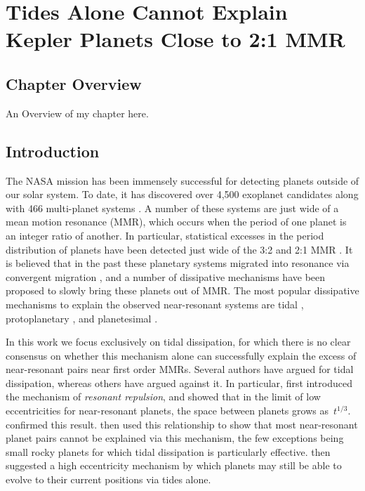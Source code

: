 \chapter[Tides Alone Cannot Explain Kepler Planets Close to 2:1 MMR]{Tides Alone Cannot Explain Kepler Planets Close to 2:1 MMR}

\section{Chapter Overview}

An Overview of my chapter here.

\section{Introduction}
\label{sec:introduction}
The NASA \kep{} mission has been immensely successful for detecting planets outside of our solar system.
To date, it has discovered over 4,500 exoplanet candidates along with 466 multi-planet systems \citep{Akeson2013,Rowe2014}. 
A number of these systems are just wide of a mean motion resonance (MMR), which occurs when the period of one planet is an integer ratio of another. 
In particular, statistical excesses in the period distribution of \kep{} planets have been detected just wide of the 3:2 and 2:1 MMR \citep[][]{Lissauer2011,Fabrycky2014,Steffen2015}.
It is believed that in the past these planetary systems migrated into resonance via convergent migration \citep{Lee2002}, and a number of dissipative mechanisms have been proposed to slowly bring these planets out of MMR.
The most popular dissipative mechanisms to explain the observed near-resonant systems are tidal \citep{LithwickWu2012, Batygin2013, Delisle2014},  protoplanetary \citep{Rein2012b, Baruteau2013, Goldreich2014}, and planetesimal \citep{Moore2013, Chatterjee2015}. 

In this work we focus exclusively on tidal dissipation, for which there is no clear consensus on whether this mechanism alone can successfully explain the excess of near-resonant pairs near first order MMRs. 
Several authors \citep{LithwickWu2012,Batygin2013} have argued for \citep{Delisle2014} tidal dissipation, whereas others \citep{Lee2013} have argued against it. 
In particular, \citet{LithwickWu2012} first introduced the mechanism of \textit{resonant repulsion}, and showed that in the limit of low eccentricities for near-resonant planets, the space between planets grows as~$t^{1/3}$.
\citet{Batygin2013} confirmed this result.
\citet{Lee2013} then used this relationship to show that most near-resonant planet pairs cannot be explained via this mechanism, the few exceptions being small rocky planets for which tidal dissipation is particularly effective.
\citet{Delisle2014} then suggested a high eccentricity mechanism by which planets may still be able to evolve to their current positions via tides alone.

